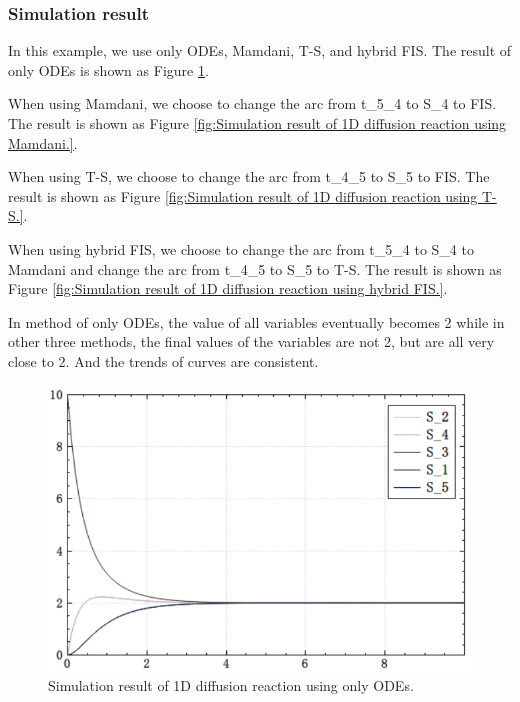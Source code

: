 \documentclass[journal,a4paper,onecolumn]{article}
\begin{document}
\clearpage
\subsubsection{Simulation result}
In this example, we use only ODEs, Mamdani, T-S, and hybrid FIS. The result of only ODEs is shown as Figure \ref{fig:Simulation result of 1D diffusion reaction using only ODEs.}.

When using Mamdani, we choose to change the arc from t\_5\_4 to S\_4 to FIS. The result is shown as Figure \ref{fig:Simulation result of 1D diffusion reaction using Mamdani.}.

When using T-S, we choose to change the arc from t\_4\_5 to S\_5 to FIS. The result is shown as Figure \ref{fig:Simulation result of 1D diffusion reaction using T-S.}.

When using hybrid FIS, we choose to change the arc from t\_5\_4 to S\_4 to Mamdani and change the arc from t\_4\_5 to S\_5 to T-S. 
The result is shown as Figure \ref{fig:Simulation result of 1D diffusion reaction using hybrid FIS.}.

In method of only ODEs, the value of all variables eventually becomes 2 while in other three methods, the final values of the variables are not 2, but are all very close to 2. And the trends of curves are consistent.

\begin{figure}[!hbt]
	\begin{center}
		\includegraphics[width=\columnwidth]{fig21}
		\caption{Simulation result of 1D diffusion reaction using only ODEs.}
		\label{fig:Simulation result of 1D diffusion reaction using only ODEs.}
	\end{center}
\end{figure}
\end{document}
